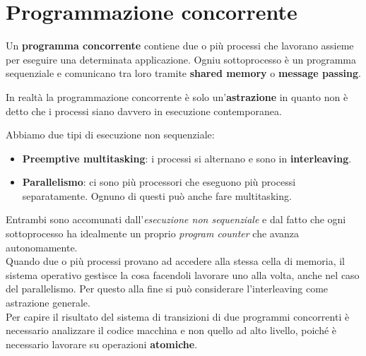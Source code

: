 \newpage
\section{Programmazione concorrente}
Un \textbf{programma concorrente} contiene due o più processi che lavorano assieme per eseguire una determinata applicazione. Ogniu sottoprocesso è un programma sequenziale e comunicano tra loro tramite \textbf{shared memory} o \textbf{message passing}.\\
\begin{note}
	In realtà la programmazione concorrente è solo un'\textbf{astrazione} in quanto non è detto che i processi siano davvero in esecuzione contemporanea.
\end{note}
Abbiamo due tipi di esecuzione non sequenziale:
\begin{itemize}
	\item \textbf{Preemptive multitasking}: i processi si alternano e sono in \textbf{interleaving}.
	\item \textbf{Parallelismo}: ci sono più processori che eseguono più processi separatamente. Ognuno di questi può anche fare multitasking.
\end{itemize}
Entrambi sono accomunati dall'\textit{esecuzione non sequenziale} e dal fatto che ogni sottoprocesso ha idealmente un proprio \textit{program counter} che avanza autonomamente.\\
Quando due o più processi provano ad accedere alla stessa cella di memoria, il sistema operativo gestisce la cosa facendoli lavorare uno alla volta, anche nel caso del parallelismo. Per questo alla fine si può considerare l'interleaving come astrazione generale.\\
Per capire il risultato del sistema di transizioni di due programmi concorrenti è necessario analizzare il codice macchina e non quello ad alto livello, poiché è necessario lavorare su operazioni \textbf{atomiche}.
